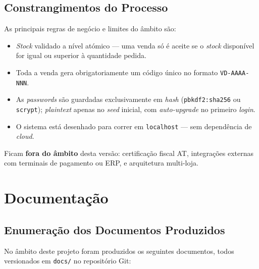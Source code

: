 \documentclass[11pt,a4paper]{report}
\begin{document}
\section{Constrangimentos do Processo}
As principais regras de negócio e limites do âmbito são:

\begin{itemize}
  \item \textit{Stock} validado a nível atómico --- uma venda só é aceite se o \textit{stock} disponível for igual ou superior à quantidade pedida.
  \item Toda a venda gera obrigatoriamente um código único no formato \texttt{VD-AAAA-NNN}.
  \item As \textit{passwords} são guardadas exclusivamente em \textit{hash} (\texttt{pbkdf2:sha256} ou \texttt{scrypt}); \textit{plaintext} apenas no \textit{seed} inicial, com \textit{auto-upgrade} no primeiro \textit{login}.
  \item O sistema está desenhado para correr em \texttt{localhost} --- sem dependência de \textit{cloud}.
\end{itemize}

Ficam \textbf{fora do âmbito} desta versão: certificação fiscal AT, integrações externas com terminais de pagamento ou ERP, e arquitetura multi-loja.

\chapter{Documentação}\label{cap:documentacao}

\section{Enumeração dos Documentos Produzidos}
No âmbito deste projeto foram produzidos os seguintes documentos, todos versionados em \texttt{docs/} no repositório Git:
\end{document}

